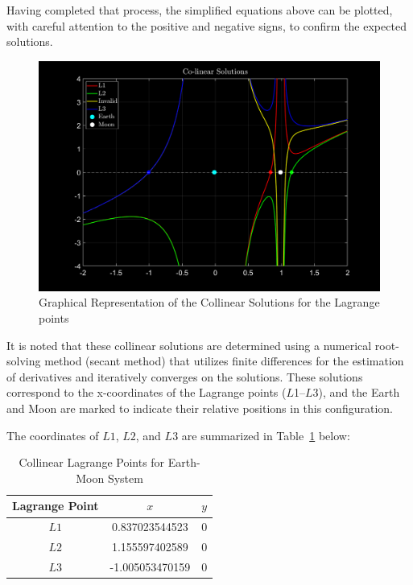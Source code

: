 \documentclass{article}
\newcommand{\cw}{\color{white}}
\newcommand{\cm}{\color{magenta}}
\begin{document}
Having completed that process, the simplified equations above can be plotted, with careful attention to the positive and negative signs, to confirm the expected solutions. 

\begin{figure}[h]
    \centering
    \includegraphics[width=\textwidth]{fig/lagrange123.png}
    \caption{Graphical Representation of the Collinear Solutions for the Lagrange points}
    \label{fig:lagrange_points}
\end{figure}

It is noted that these collinear solutions are determined using a numerical root-solving method (secant method) that utilizes finite differences for the estimation of derivatives and iteratively converges on the solutions. These solutions correspond to the x-coordinates of the Lagrange points ($L$1--$L$3), and the Earth and Moon are marked to indicate their relative positions in this configuration.

\vspace{\baselineskip}

\pagebreak

The coordinates of $L1$, $L2$, and $L3$ are summarized in Table~\ref{tab:table3} below:

\begin{table}[h]
    \centering
    \caption{\cw Collinear Lagrange Points for Earth-Moon System}
    \begin{tabular}{ccc} \toprule
        {Lagrange Point} & {$x$} & {$y$}   \\ \midrule
        \cm $L1$ \cw  &  0.837023544523  & 0   \\
        \cm $L2$ \cw  &  1.155597402589  & 0   \\
        \cm $L3$ \cw  & -1.005053470159  & 0   \\  \bottomrule
    \end{tabular}
    \label{tab:table3}
\end{table}
\end{document}

